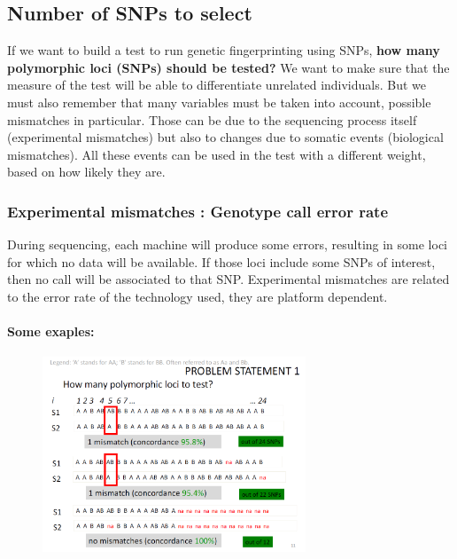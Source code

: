 \subsection*{Number of SNPs to select} 

If we want to build a test to run genetic fingerprinting using SNPs, \textbf{how many polymorphic loci (SNPs) should be tested?} 
We want to make sure that the measure of the test will be able to differentiate unrelated individuals. 
But we must also remember that many variables must be taken into account, possible mismatches in particular. Those can be due to the sequencing process itself (experimental mismatches) but also to changes due to somatic events (biological mismatches). All these events can be used in the test with a different weight, based on how likely they are. 


\subsubsection*{Experimental mismatches : Genotype call error rate}

During sequencing, each machine will produce some errors, resulting in some loci for which no data will be available. If those loci include some SNPs of interest, then no call will be associated to that SNP. 
Experimental mismatches are related to the error rate of the technology used, they are platform dependent. 

\paragraph*{Some exaples:}

\begin{figure}
	\centering
	\includegraphics[width=0.7\textwidth]{SNP_number.PNG}
	\caption{\label{fig:SNP_number}}
\end{figure}

